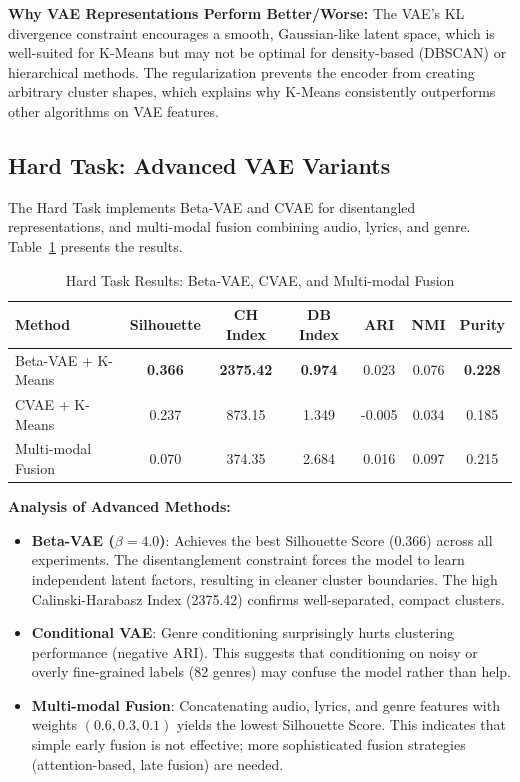 \documentclass{article}
\begin{document}
\textbf{Why VAE Representations Perform Better/Worse:}
The VAE's KL divergence constraint encourages a smooth, Gaussian-like latent space, which is well-suited for K-Means but may not be optimal for density-based (DBSCAN) or hierarchical methods. The regularization prevents the encoder from creating arbitrary cluster shapes, which explains why K-Means consistently outperforms other algorithms on VAE features.

\subsection{Hard Task: Advanced VAE Variants}

The Hard Task implements Beta-VAE and CVAE for disentangled representations, and multi-modal fusion combining audio, lyrics, and genre. Table~\ref{tab:hard} presents the results.

\begin{table}[h]
\caption{Hard Task Results: Beta-VAE, CVAE, and Multi-modal Fusion}
\label{tab:hard}
\centering
\begin{tabular}{lcccccc}
\toprule
Method & Silhouette & CH Index & DB Index & ARI & NMI & Purity \\
\midrule
Beta-VAE + K-Means & \textbf{0.366} & \textbf{2375.42} & \textbf{0.974} & 0.023 & 0.076 & \textbf{0.228} \\
CVAE + K-Means & 0.237 & 873.15 & 1.349 & -0.005 & 0.034 & 0.185 \\
Multi-modal Fusion & 0.070 & 374.35 & 2.684 & 0.016 & 0.097 & 0.215 \\
\bottomrule
\end{tabular}
\end{table}

\textbf{Analysis of Advanced Methods:}
\begin{itemize}
    \item \textbf{Beta-VAE ($\beta=4.0$)}: Achieves the best Silhouette Score (0.366) across all experiments. The disentanglement constraint forces the model to learn independent latent factors, resulting in cleaner cluster boundaries. The high Calinski-Harabasz Index (2375.42) confirms well-separated, compact clusters.
    
    \item \textbf{Conditional VAE}: Genre conditioning surprisingly hurts clustering performance (negative ARI). This suggests that conditioning on noisy or overly fine-grained labels (82 genres) may confuse the model rather than help.
    
    \item \textbf{Multi-modal Fusion}: Concatenating audio, lyrics, and genre features with weights $(0.6, 0.3, 0.1)$ yields the lowest Silhouette Score. This indicates that simple early fusion is not effective; more sophisticated fusion strategies (attention-based, late fusion) are needed.
\end{itemize}
\end{document}
